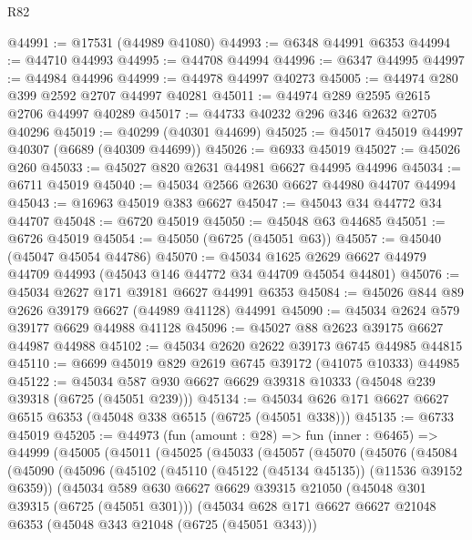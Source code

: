 \begin{lexlean}{R82}
\begin{coremodule}
@44991 := @17531 (@44989 @41080)
@44993 := @6348 @44991 @6353
@44994 := @44710 @44993
@44995 := @44708 @44994
@44996 := @6347 @44995
@44997 := @44984 @44996
@44999 := @44978 @44997 @40273
@45005 := @44974 @280 @399 @2592 @2707 @44997 @40281
@45011 := @44974 @289 @2595 @2615 @2706 @44997 @40289
@45017 := @44733 @40232 @296 @346 @2632 @2705 @40296
@45019 := @40299 (@40301 @44699)
@45025 := @45017 @45019 @44997 @40307 (@6689 (@40309 @44699))
@45026 := @6933 @45019
@45027 := @45026 @260
@45033 := @45027 @820 @2631 @44981 @6627 @44995 @44996
@45034 := @6711 @45019
@45040 := @45034 @2566 @2630 @6627 @44980 @44707 @44994
@45043 := @16963 @45019 @383 @6627
@45047 := @45043 @34 @44772 @34 @44707
@45048 := @6720 @45019
@45050 := @45048 @63 @44685
@45051 := @6726 @45019
@45054 := @45050 (@6725 (@45051 @63))
@45057 := @45040 (@45047 @45054 @44786)
@45070 := @45034
    @1625
    @2629
    @6627
    @44979
    @44709
    @44993
    (@45043 @146 @44772 @34 @44709 @45054 @44801)
@45076 := @45034 @2627 @171 @39181 @6627 @44991 @6353
@45084 := @45026 @844 @89 @2626 @39179 @6627 (@44989 @41128) @44991
@45090 := @45034 @2624 @579 @39177 @6629 @44988 @41128
@45096 := @45027 @88 @2623 @39175 @6627 @44987 @44988
@45102 := @45034 @2620 @2622 @39173 @6745 @44985 @44815
@45110 := @6699 @45019 @829 @2619 @6745 @39172 (@41075 @10333) @44985
@45122 := @45034 @587 @930 @6627 @6629 @39318 @10333 (@45048 @239 @39318 (@6725 (@45051 @239)))
@45134 := @45034 @626 @171 @6627 @6627 @6515 @6353 (@45048 @338 @6515 (@6725 (@45051 @338)))
@45135 := @6733 @45019
@45205 := @44973
    (fun (amount : @28) =>
    fun (inner : @6465) =>
    @44999
      (@45005
        (@45011
          (@45025
            (@45033
              (@45057
                (@45070
                  (@45076
                    (@45084
                      (@45090
                        (@45096
                          (@45102
                            (@45110 (@45122 (@45134 @45135)) (@11536 @39152 @6359))
                            (@45034
                              @589
                              @630
                              @6627
                              @6629
                              @39315
                              @21050
                              (@45048 @301 @39315 (@6725 (@45051 @301)))
                              (@45034
                                @628
                                @171
                                @6627
                                @6627
                                @21048
                                @6353
                                (@45048 @343 @21048 (@6725 (@45051 @343)))

\end{coremodule}
\end{lexlean}
